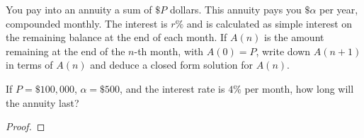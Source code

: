 \begin{problem}{1}
  You pay into an annuity a sum of $\$P$ dollars. This annuity
  pays you $\$\alpha$ per year, compounded monthly. The interest is $r\%$ and is calculated
  as simple interest on the remaining balance at the end of each month. If $A(n)$
  is the amount remaining at the end of the $n$-th month, with $A(0) = P$,
  write down $A(n+1)$ in terms of $A(n)$ and deduce a closed form solution
  for $A(n)$.

  If $P = \$100,000$, $\alpha = \$500$, and the interest rate is $4\%$ per month,
  how long will the annuity last?
\end{problem}

\begin{proof}

\end{proof}
\newpage
